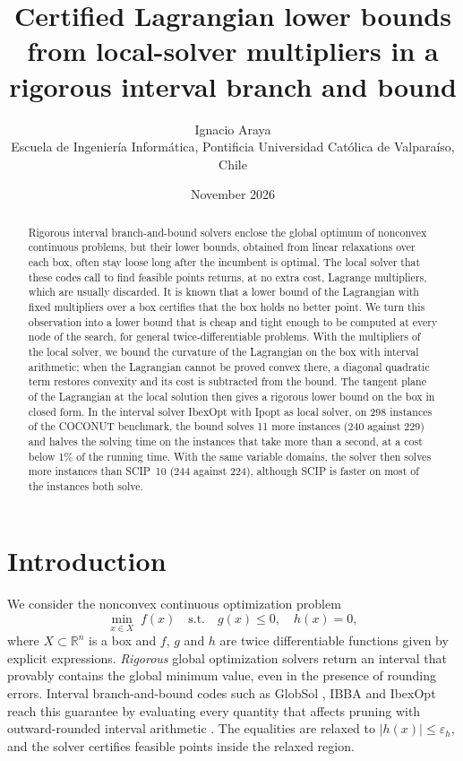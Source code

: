 \documentclass[11pt]{article}
\title{Certified Lagrangian lower bounds from local-solver multipliers
in a rigorous interval branch and bound}
\author{Ignacio Araya\\ \small Escuela de Ingenier\'ia Inform\'atica, Pontificia Universidad Cat\'olica de Valpara\'iso, Chile}
\date{November 2026}
\begin{document}
\maketitle

\begin{abstract}
Rigorous interval branch-and-bound solvers enclose the global optimum of nonconvex
continuous problems, but their lower bounds, obtained from linear relaxations over each
box, often stay loose long after the incumbent is optimal. The local solver that these
codes call to find feasible points returns, at no extra cost, Lagrange multipliers,
which are usually discarded. It is known that a lower bound of the Lagrangian with
fixed multipliers over a box certifies that the box holds no better point. We turn this
observation into a lower bound that is cheap and tight enough to be computed at every
node of the search, for general twice-differentiable problems. With the multipliers of
the local solver, we bound the curvature of the Lagrangian on the box with interval
arithmetic; when the Lagrangian cannot be proved convex there, a diagonal quadratic term
restores convexity and its cost is subtracted from the bound. The tangent plane of the
Lagrangian at the local solution then gives a rigorous lower bound on the box in closed
form. In the interval solver IbexOpt with Ipopt as local solver, on 298 instances of the
COCONUT benchmark, the bound solves 11 more instances (240 against 229) and halves the
solving time on the instances that take more than a second, at a cost below 1\% of the
running time. With the same variable domains, the solver then solves more instances than
SCIP~10 (244 against 224), although SCIP is faster on most of the instances both solve.
\end{abstract}

\section{Introduction}

We consider the nonconvex continuous optimization problem
\begin{equation}\label{eq:P}
  \min_{x \in X} \; f(x) \quad \text{s.t.} \quad g(x) \le 0, \quad h(x) = 0,
\end{equation}
where $X \subset \mathbb{R}^n$ is a box and $f$, $g$ and $h$ are twice
differentiable functions given by explicit expressions. \emph{Rigorous} global
optimization solvers return an interval that provably contains the global minimum value,
even in the presence of rounding errors. Interval branch-and-bound codes such as
GlobSol \citep{Kearfott1996}, IBBA \citep{Ninin2015} and IbexOpt
\citep{Trombettoni2011,Araya2014} reach this guarantee by evaluating every quantity
that affects pruning with outward-rounded interval arithmetic
\citep{HansenWalster2004,Neumaier2004}. The equalities are relaxed to
$|h(x)| \le \varepsilon_h$, and the solver certifies feasible points inside the
relaxed region.
\end{document}

